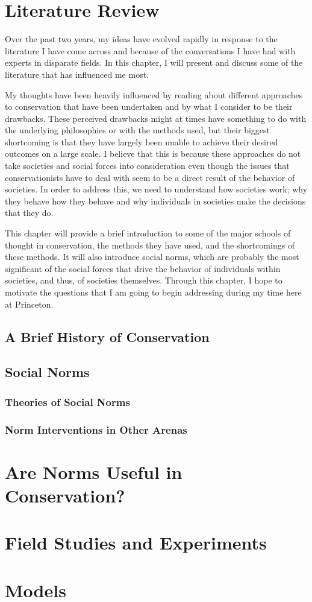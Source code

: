 \documentclass[rutwik_proposal.tex]{subfiles}
\begin{document}
\chapter{Literature Review}\label{ch:litrev}

Over the past two years, my ideas have evolved rapidly in response to the literature I have come across and because of the conversations I have had with experts in disparate fields. In this chapter, I will present and discuss some of the literature that has influenced me most.

My thoughts have been heavily influenced by reading about different approaches to conservation that have been undertaken and by what I consider to be their drawbacks. These perceived drawbacks might at times have something to do with the underlying philosophies or with the methods used, but their biggest shortcoming is that they have largely been unable to achieve their desired outcomes on a large scale. I believe that this is because these approaches do not take societies and social forces into consideration even though the issues that conservationists have to deal with seem to be a direct result of the behavior of societies. In order to address this, we need to understand how societies work; why they behave how they behave and why individuals in societies make the decisions that they do.

This chapter will provide a brief introduction to some of the major schools of thought in conservation, the methods they have used, and the shortcomings of these methods. It will also introduce social norms, which are probably the most significant of the social forces that drive the behavior of individuals within societies, and thus, of societies themselves. Through this chapter, I hope to motivate the questions that I am going to begin addressing during my time here at Princeton.

\section{A Brief History of Conservation}\label{sec:history}


\section{Social Norms}\label{sec:norms}
\subsection{Theories of Social Norms}\label{subsec:theories}
\subsection{Norm Interventions in Other Arenas}\label{subsec:interventions}

\chapter{Are Norms Useful in Conservation?}\label{ch:usefulness}

\chapter{Field Studies and Experiments}\label{ch:field}

\chapter{Models}\label{ch:models}
\end{document}

